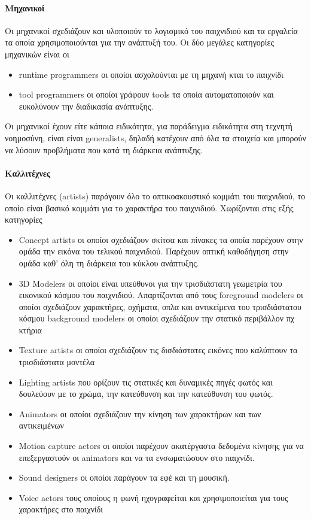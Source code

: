 	\paragraph{Μηχανικοί}	
	Οι μηχανικοί σχεδιάζουν και υλοποιούν το λογισμικό του παιχνιδιού και τα εργαλεία τα οποία χρησιμοποιούνται για την ανάπτυξή του. Οι δύο μεγάλες κατηγορίες μηχανικών είναι οι
	\begin{itemize}
		\item runtime programmers οι οποίοι ασχολούνται με τη μηχανή κται το παιχνίδι 
		\item tool programmers οι οποίοι γράφουν tools τα οποία αυτοματοποιούν και ευκολύνουν την διαδικασία ανάπτυξης.
	\end{itemize}
	Οι μηχανικοί έχουν είτε κάποια ειδικότητα, για παράδειγμα ειδικότητα στη τεχνητή νοημοσύνη, είναι είναι generalists, δηλαδή κατέχουν από όλα τα στοιχεία και μπορούν να λύσουν προβλήματα που κατά τη διάρκεια ανάπτυξης.
	
	\paragraph{Καλλιτέχνες}
	Οι καλλιτέχνες (artists) παράγουν όλο το οπτικοακουστικό κομμάτι του παιχνιδιού, το οποίο είναι βασικό κομμάτι για το χαρακτήρα του παιχνιδιού. Χωρίζονται στις εξής κατηγορίες
	
	\begin{itemize}
		\item Concept artists οι οποίοι σχεδιάζουν σκίτσα και πίνακες τα οποία παρέχουν στην ομάδα την εικόνα του τελικού παιχνιδιού. Παρέχουν οπτική καθοδήγηση στην ομάδα καθ' όλη τη διάρκεια του κύκλου ανάπτυξης.
		\item 3D Modelers οι οποίοι είναι υπεύθυνοι για την τρισδιάστατη γεωμετρία του εικονικού κόσμου του παιχνιδιού. Απαρτίζονται από τους
		foreground modelers οι οποίοι σχεδιάζουν χαρακτήρες, οχήματα, οπλα και αντικείμενα του τρισδιάστατου κόσμου
		background modelers οι οποίοι σχεδιάζουν την στατικό περιβάλλον πχ κτήρια
		\item Texture artists οι οποίοι σχεδιάζουν τις δισδιάστατες εικόνες που καλύπτουν τα τρισδιάστατα μοντέλα
		\item Lighting artists που ορίζουν τις στατικές και δυναμικές πηγές φωτός και δουλεύουν με το χρώμα, την κατεύθυνση και την κατεύθυνση του φωτός.
		\item Animators οι οποίοι σχεδιάζουν την κίνηση των χαρακτήρων και των αντικειμένων
		\item Motion capture actors οι οποίοι παρέχουν ακατέργαστα δεδομένα κίνησης για να επεξεργαστούν οι animators και να τα ενσωματώσουν στο παιχνίδι.
		\item Sound designers οι οποίοι παράγουν τα εφέ και τη μουσική.
		\item Voice actors τους οποίους η φωνή ηχογραφείται και χρησιμοποιείται για τους χαρακτήρες στο παιχνίδι
	\end{itemize}
	
